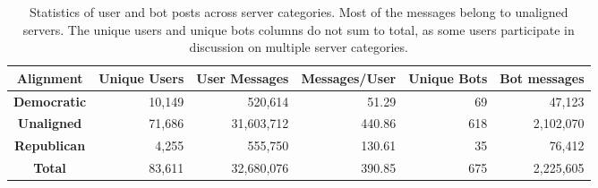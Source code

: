\begin{table*}[H]
\small
\centering
\begin{tabular}{crrrrr} \toprule
\textbf{Alignment} & \textbf{Unique Users} & \textbf{User Messages} & \textbf{Messages/User} & \textbf{Unique Bots} & \textbf{Bot messages} \\ \midrule
\textbf{Democratic}    & 10,149                & 520,614                & 51.29                  & 69                   & 47,123                \\
\textbf{Unaligned} & 71,686                & 31,603,712             & 440.86                 & 618                  & 2,102,070             \\
\textbf{Republican}   & 4,255                 & 555,750                & 130.61                 & 35                   & 76,412                \\
\textbf{Total}   & 83,611                & 32,680,076             & 390.85                 & 675                  & 2,225,605             \\ \bottomrule
\end{tabular}
\caption{Statistics of user and bot posts across server categories. Most of the messages belong to unaligned servers. The unique users and unique bots columns do not sum to total, as some users participate in discussion on multiple server categories.}
\label{tab:statistics}
\end{table*}
